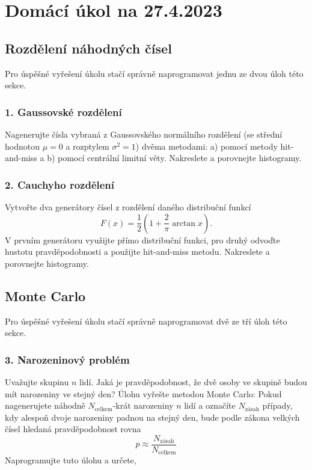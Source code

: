 \documentclass[a4paper,11pt,twoside]{article}
\begin{document}
\section*{Domácí úkol na 27.4.2023}
\subsection*{Rozdělení náhodných čísel}
Pro úspěšné vyřešení úkolu stačí správně naprogramovat jednu ze dvou úloh této sekce.
    \subsubsection*{1. Gaussovské rozdělení}
        Nagenerujte čísla vybraná z Gaussovského normálního rozdělení (se střední hodnotou $\mu=0$ a rozptylem $\sigma^{2}=1$) dvěma metodami: a) pomocí metody hit-and-miss a b) pomocí centrální limitní věty.
        Nakreslete a porovnejte histogramy.

    \subsubsection*{2. Cauchyho rozdělení}
        Vytvořte dva generátory čísel z rozdělení daného distribuční funkcí
        \begin{equation*}
            F(x)=\frac{1}{2}\left(1+\frac{2}{\pi}\arctan{x}\right).
        \end{equation*}
        V prvním generátoru využijte přímo distribuční funkci, pro druhý odvoďte hustotu pravděpodobnosti a použijte hit-and-miss metodu.
        Nakreslete a porovnejte histogramy.

\subsection*{Monte Carlo}
Pro úspěšné vyřešení úkolu stačí správně naprogramovat dvě ze tří úloh této sekce.
\subsubsection*{3. Narozeninový problém}
    Uvažujte skupinu $n$ lidí. 
    Jaká je pravděpodobnost, že dvě osoby ve skupině budou mít narozeniny ve stejný den? 
    Úlohu vyřešte metodou Monte Carlo: 
    Pokud nagenerujete náhodně $N_\text{celkem}$-krát narozeniny $n$ lidí a označíte $N_{\text{zásah}}$ případy, kdy alespoň dvoje narozeniny padnou na stejný den, 
    bude podle zákona velkých čísel hledaná pravděpodobnost rovna
    \begin{equation*}
        p\approx\frac{N_{\text{zásah}}}{N_{\text{celkem}}}
    \end{equation*}
    Naprogramujte tuto úlohu a určete,
\end{document}
